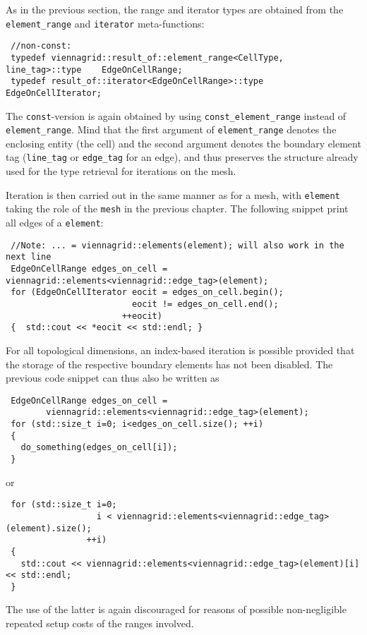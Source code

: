 
As in the previous section, the range and iterator types are obtained from the \lstinline|element_range| and \lstinline|iterator| meta-functions:
\begin{lstlisting}
 //non-const:
 typedef viennagrid::result_of::element_range<CellType, line_tag>::type    EdgeOnCellRange;
 typedef result_of::iterator<EdgeOnCellRange>::type                        EdgeOnCellIterator;
\end{lstlisting}
The \lstinline|const|-version is again obtained by using \lstinline|const_element_range| instead of \lstinline|element_range|.
Mind that the first argument of \lstinline|element_range| denotes the enclosing entity (the cell) and the second argument denotes the boundary element tag (\lstinline|line_tag| or \lstinline|edge_tag| for an edge), and thus preserves the structure already used for the type retrieval for iterations on the mesh.

Iteration is then carried out in the same manner as for a mesh, with \lstinline|element| taking the role of the \lstinline|mesh| in the previous chapter.
The following snippet print all edges of a \lstinline|element|:
\begin{lstlisting}
 //Note: ... = viennagrid::elements(element); will also work in the next line
 EdgeOnCellRange edges_on_cell = viennagrid::elements<viennagrid::edge_tag>(element);
 for (EdgeOnCellIterator eocit = edges_on_cell.begin();
                         eocit != edges_on_cell.end();
                       ++eocit)
 {  std::cout << *eocit << std::endl; } 
\end{lstlisting}

For all topological dimensions, an index-based iteration is possible provided that the storage of the respective boundary elements has not been disabled. The previous code snippet can thus also be written as
\begin{lstlisting}
 EdgeOnCellRange edges_on_cell =
        viennagrid::elements<viennagrid::edge_tag>(element);
 for (std::size_t i=0; i<edges_on_cell.size(); ++i)
 { 
   do_something(edges_on_cell[i]);
 }
\end{lstlisting}
or
\begin{lstlisting}
 for (std::size_t i=0;
                  i < viennagrid::elements<viennagrid::edge_tag>(element).size();
                ++i)
 {
   std::cout << viennagrid::elements<viennagrid::edge_tag>(element)[i] << std::endl;
 }
\end{lstlisting}
The use of the latter is again discouraged for reasons of possible non-negligible repeated setup costs of the ranges involved.

